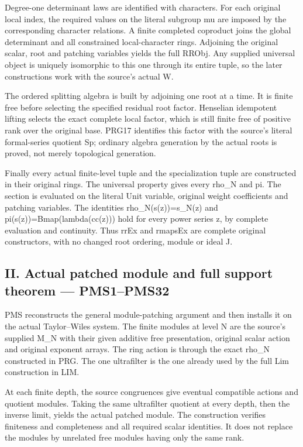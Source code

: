 Degree-one determinant laws are identified with characters. For each original local index, the required values on the literal subgroup mu are imposed by the corresponding character relations. A finite completed coproduct joins the global determinant and all constrained local-character rings. Adjoining the original scalar, root and patching variables yields the full RRObj. Any supplied universal object is uniquely isomorphic to this one through its entire tuple, so the later constructions work with the source's actual W.

The ordered splitting algebra is built by adjoining one root at a time. It is finite free before selecting the specified residual root factor. Henselian idempotent lifting selects the exact complete local factor, which is still finite free of positive rank over the original base. PRG17 identifies this factor with the source's literal formal-series quotient Sp; ordinary algebra generation by the actual roots is proved, not merely topological generation.

Finally every actual finite-level tuple and the specialization tuple are constructed in their original rings. The universal property gives every rho\_\allowbreak{}N and pi. The section is evaluated on the literal Unit variable, original weight coefficients and patching variables. The identities rho\_\allowbreak{}N(s(z))=s\_\allowbreak{}N(z) and pi(s(z))=Bmap(lambda(cc(z))) hold for every power series z, by complete evaluation and continuity. Thus rrEx and rmapsEx are complete original constructors, with no changed root ordering, module or ideal J.

\subsection{II. Actual patched module and full support theorem — PMS1–PMS32}

PMS reconstructs the general module-patching argument and then installs it on the actual Taylor–Wiles system. The finite modules at level N are the source's supplied M\_\allowbreak{}N with their given additive free presentation, original scalar action and original exponent arrays. The ring action is through the exact rho\_\allowbreak{}N constructed in PRG. The one ultrafilter is the one already used by the full Lim construction in LIM.

At each finite depth, the source congruences give eventual compatible actions and quotient modules. Taking the same ultrafilter quotient at every depth, then the inverse limit, yields the actual patched module. The construction verifies finiteness and completeness and all required scalar identities. It does not replace the modules by unrelated free modules having only the same rank.

